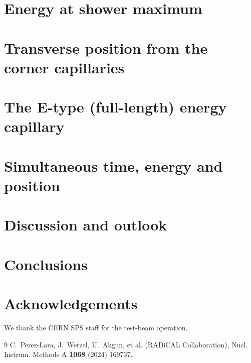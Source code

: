\documentclass[final,5p,times,twocolumn]{elsarticle}
\begin{document}
\section{Energy at shower maximum}
\label{sec:energy}

\section{Transverse position from the corner capillaries}
\label{sec:position}

\section{The E-type (full-length) energy capillary}
\label{sec:etype}

\section{Simultaneous time, energy and position}
\label{sec:fourd}

\section{Discussion and outlook}
\label{sec:discuss}

\section{Conclusions}
\label{sec:conclusions}

\section*{Acknowledgements}
We thank the CERN SPS staff for the test-beam operation. %

\begin{thebibliography}{9}
 C.~Perez-Lara, J.~Wetzel, U.~Akgun, et al. (RADiCAL Collaboration),
Nucl. Instrum. Methods A \textbf{1068} (2024) 169737.
\end{thebibliography}
\end{document}
